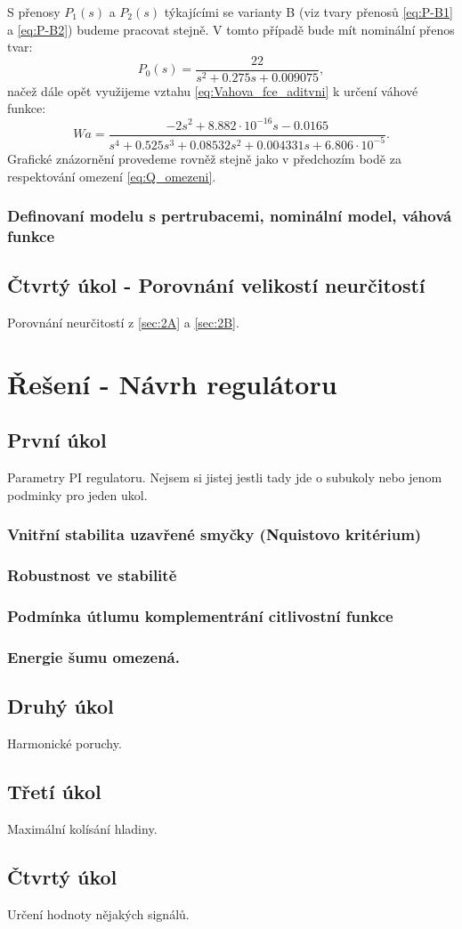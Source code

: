 \documentclass[a4paper,11pt]{article}
\begin{document}
S přenosy $ P_{1}\left ( s \right ) $ a $ P_{2}\left ( s \right ) $ týkajícími se varianty B (viz tvary přenosů \ref{eq:P-B1} a \ref{eq:P-B2}) budeme pracovat stejně. V tomto případě bude mít nominální přenos tvar:
\begin{equation}\label{eq:P-B0} 
P_{0}\left ( s \right ) =\frac{22}{s^{2} + 0.275 s + 0.009075},
\end{equation}
načež dále opět využijeme vztahu \ref{eq:Vahova_fce_aditvni} k určení váhové funkce:
\begin{equation}\label{eq:Wa-B}
Wa = \frac{-2s^{2} + 8.882\cdot 10^{-16}s - 0.0165}{s^{4} + 0.525 s^{3} + 0.08532 s^{2} + 0.004331 s + 6.806\cdot 10^{-5}}.
\end{equation}
Grafické znázornění provedeme rovněž stejně jako v předchozím bodě za respektování omezení \ref{eq:Q_omezeni}.
\subsubsection{Definovaní modelu s pertrubacemi, nominální model, váhová funkce}
\subsection{Čtvrtý úkol - Porovnání velikostí neurčitostí}
Porovnání neurčitostí z \ref{sec:2A} a \ref{sec:2B}.


\newpage 
\section{Řešení - Návrh regulátoru}
\subsection{První úkol}
Parametry PI regulatoru. Nejsem si jistej jestli tady jde o subukoly nebo jenom podminky pro jeden ukol.
\subsubsection{Vnitřní stabilita uzavřené smyčky (Nquistovo kritérium)}
\subsubsection{Robustnost ve stabilitě}
\subsubsection{Podmínka útlumu komplementrání citlivostní funkce}
\subsubsection{Energie šumu omezená.}
\subsection{Druhý úkol}
Harmonické poruchy.
\subsection{Třetí úkol}
Maximální kolísání hladiny.
\subsection{Čtvrtý úkol}
Určení hodnoty nějakých signálů.
\end{document}
